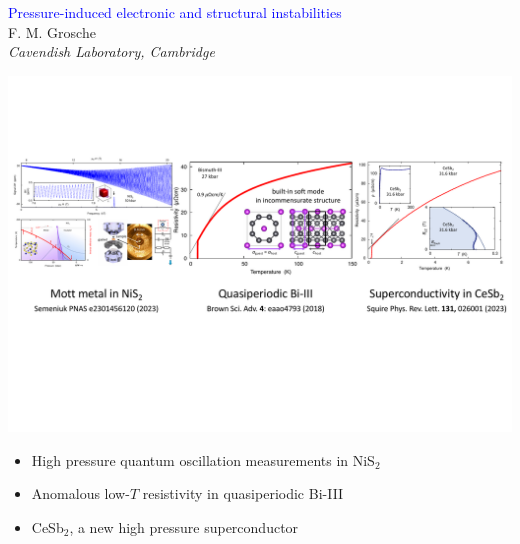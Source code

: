 \begin{emptyframe}
\begin{center}
\textcolor{Blue}{Pressure-induced electronic and structural instabilities} \\
\vspace{0.5em}
{\footnotesize F. M. Grosche} \\
{\footnotesize \em Cavendish Laboratory, Cambridge} \\
\vspace{0.1em}
\end{center}
\vspace{0.0em}
        \centerline{ \includegraphics[width=\columnwidth]{IntroPicture2}}

\vspace{1em}
\begin{itemize}
    \item<1-> High pressure quantum oscillation measurements in NiS$_2$
    \item<2-> Anomalous low-$T$ resistivity in quasiperiodic Bi-III
    \item<3-> CeSb$_2$, a new high pressure superconductor
\end{itemize}
\end{emptyframe}

